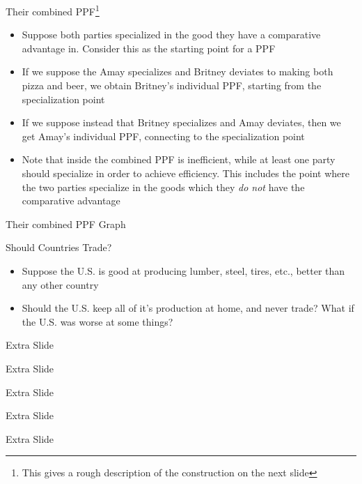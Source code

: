 \documentclass[10pt,xcolor={svgnames}]{beamer}
\begin{document}
\begin{frame}{Their combined PPF\footnote{This gives a rough description of the construction on the next slide}}
\begin{itemize}[<+->]
    \item Suppose both parties specialized in the good they have a comparative advantage in. Consider this as the starting point for a PPF
    \item If we suppose the Amay specializes and Britney deviates to making both pizza and beer, we obtain Britney's individual PPF, starting from the specialization point
    \item If we suppose instead that Britney specializes and Amay deviates, then we get Amay's individual PPF, connecting to the specialization point
    \item Note that inside the combined PPF is inefficient, while at least one party should specialize in order to achieve efficiency. This includes the point where the two parties specialize in the goods which they \textit{do not} have the comparative advantage
\end{itemize}
\end{frame}

\begin{frame}{Their combined PPF Graph}

\end{frame}

\begin{frame}{Should Countries Trade?}
\begin{itemize}[<+->]
    \item Suppose the U.S. is good at producing lumber, steel, tires, etc., better than any other country
    \item Should the U.S. keep all of it's production at home, and never trade? What if the U.S. was worse at some things?
\end{itemize}
\end{frame}

\begin{frame}{Extra Slide}

\end{frame}

\begin{frame}{Extra Slide}

\end{frame}

\begin{frame}{Extra Slide}

\end{frame}

\begin{frame}{Extra Slide}

\end{frame}

\begin{frame}{Extra Slide}

\end{frame}
\end{document}
